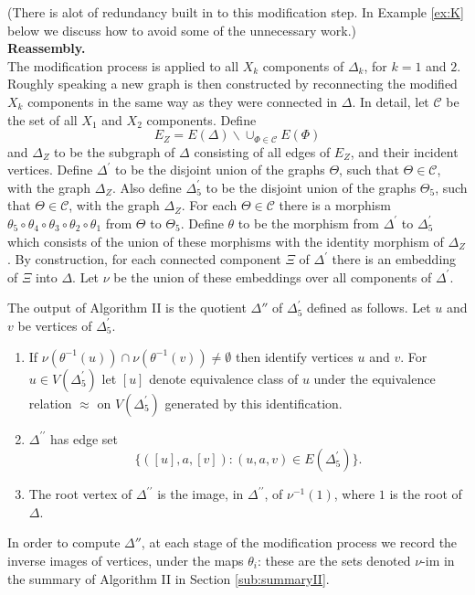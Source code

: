 \documentclass[a4paper,12pt]{article}
\newcommand{\D}{\Delta }
\newcommand{\T}{\Theta }
\newcommand{\nul}{\emptyset }
\newcommand{\vim}{\nu\textrm{-im}}
\numberwithin{equation}{section}
\numberwithin{figure}{section}
\newcommand{\cC}{\mathcal{C}}
\newcommand{\bs}{\backslash}
\newcommand{\be}{\begin{enumerate}}
\newcommand{\ee}{\end{enumerate}}
\begin{document}
(There is alot of redundancy built in to this modification step. In 
Example \ref{ex:K} below we discuss how to avoid some of the unnecessary
 work.)\\[1em]


\noindent\textbf{Reassembly.}\\
The modification process is applied to all $X_k$ components of $\D_k$,
for $k=1$ and $2$. Roughly speaking a new graph is then constructed by
reconnecting the modified $X_k$ components in the same way as they
were connected in $\D$. In detail,
let $\cC$ be the set of all
$X_1$ and $X_2$ components.
Define
\[E_Z=E(\D)\bs \cup_{\Phi\in \cC} E(\Phi)\]
and $\D_Z$ to be the subgraph of $\D$ consisting of all edges
of $E_Z$, and their incident vertices.
Define $\D^\prime$ to be the disjoint union of the
 graphs $\T$, such that $\T\in \cC$, with  the graph $\D_Z$.
Also define $\D^{\prime}_5$ to be the disjoint union of the graphs
$\T_5$, such that $\T\in \cC$, with the graph $\D_Z$. For each
$\T\in \cC$ there is  a morphism
$\theta_5\circ\theta_4\circ\theta_3\circ\theta_2\circ\theta_1$
from $\T$ to $\T_5$. Define $\theta$ to be the morphism from
$\D^\prime$ to $\D^\prime_5$ which consists of the union of these
morphisms with the identity morphism of $\D_Z$. By
construction, for each connected component $\Xi$ of $\D^\prime$
there is an embedding of $\Xi$ into $\D$. Let $\nu$ be the union
of these embeddings over all components of $\D^\prime$.

The output of Algorithm II is the quotient $\D''$ of
 $\D^\prime_5$ defined as follows.
Let $u$ and $v$ be vertices
 of $\D^\prime_5$.
\be[R1]
\item\label{it:R1} If $\nu(\theta^{-1}(u))\cap \nu(\theta^{-1}(v))\neq \nul$ then
identify vertices $u$ and $v$.
For $u \in V(\D^\prime_5)$ let
$[u]$  denote equivalence class of $u$ under the equivalence relation $\approx$ 
on $V(\D^\prime_5)$ generated by this identification.
\item
$\D^{\prime\prime}$ has edge set
\[\{([u],a,[v]): (u,a,v)\in E(\D^\prime_5)\}.\]
\item The root vertex of $\D^{\prime\prime}$ is the image, in
$\D^{\prime\prime}$, of $\nu^{-1}(1)$, where $1$ is  the root of
$\D$.
\ee
In order to compute $\D''$, at each stage of the modification process
we record the inverse images of vertices, under the maps $\theta_i$: these are the
sets denoted $\vim$ in the summary of Algorithm II in Section \ref{sub:summaryII}.
\end{document}
